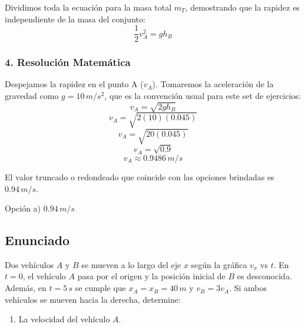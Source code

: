 \documentclass[12pt, a4paper]{article}
\begin{document}
Dividimos toda la ecuación para la masa total $m_T$, demostrando que la rapidez es independiente de la masa del conjunto:
$$ \frac{1}{2} v_A^2 = g h_B $$

\subsubsection*{4. Resolución Matemática}
Despejamos la rapidez en el punto A ($v_A$). Tomaremos la aceleración de la gravedad como $g = 10 \, \si{m/s^2}$, que es la convención usual para este set de ejercicios:
$$ v_A = \sqrt{2 g h_B} $$
$$ v_A = \sqrt{2 (10) (0.045)} $$
$$ v_A = \sqrt{20 (0.045)} $$
$$ v_A = \sqrt{0.9} $$
$$ v_A \approx 0.9486 \, \si{m/s} $$

El valor truncado o redondeado que coincide con las opciones brindadas es $0.94 \, \si{m/s}$.

\begin{tcolorbox}[colback=green!5!white, colframe=green!50!black, title=Respuesta Final]
\centering Opción a) $0.94 \, \si{m/s}$
\end{tcolorbox}

\newpage

\subsection*{Enunciado}
Dos vehículos $A$ y $B$ se mueven a lo largo del eje $x$ según la gráfica $v_x$ vs $t$. En $t = 0$, el vehículo $A$ pasa por el origen y la posición inicial de $B$ es desconocida. Además, en $t = 5 \, \si{s}$ se cumple que $x_A = x_B = 40 \, \si{m}$ y $v_B = 3v_A$. Si ambos vehículos se mueven hacia la derecha, determine:
\begin{enumerate}[label=\alph*)]
    \item La velocidad del vehículo $A$.
\end{enumerate}

\begin{center}
\end{center}
\end{document}
